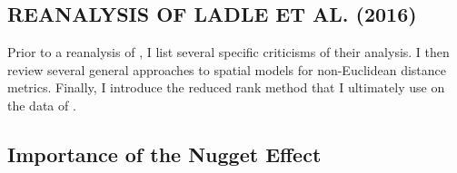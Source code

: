 \documentclass[11pt, titlepage]{article}\usepackage[]{graphicx}\usepackage[]{color}
\begin{document}
\begin{spacing}{1.9}
\begin{flushleft}










\section*{REANALYSIS OF LADLE ET AL. (2016)}

Prior to a reanalysis of \citet{Ladl:Avga:Whea:Boyc:pred:2016}, I list several specific criticisms of their analysis.  I then review several general approaches to spatial models for non-Euclidean distance metrics. Finally, I introduce the reduced rank method that I ultimately use on the data of \citet{Ladl:Avga:Whea:Boyc:pred:2016}.

\subsection*{Importance of the Nugget Effect}


\end{flushleft}
\end{spacing}
\end{document}
